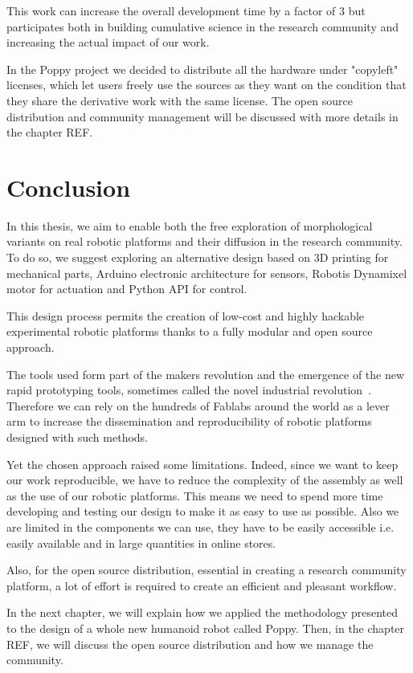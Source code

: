 This work can increase the overall development time by a factor of 3 but participates both in building cumulative science in the research community and increasing the actual impact of our work.

In the Poppy project we decided to distribute all the hardware under "copyleft" licenses, which let users freely use the sources as they want on the condition that they share the derivative work with the same license.
The open source distribution and community management will be discussed with more details in the chapter REF.


\section{Conclusion} %

In this thesis, we aim to enable both the free exploration of morphological variants on real robotic platforms and their diffusion in the research community. To do so, we suggest exploring an alternative design based on 3D printing for mechanical parts, Arduino electronic architecture for sensors, Robotis Dynamixel motor for actuation and Python API for control.

This design process permits the creation of low-cost and highly hackable experimental robotic platforms thanks to a fully modular and open source approach.

The tools used form part of the makers revolution and the emergence of the new rapid prototyping tools, sometimes called the novel industrial revolution~\parencite{anderson}. Therefore we can rely on the hundreds of Fablabs around the world as a lever arm to increase the dissemination and reproducibility of robotic platforms designed with such methods.

Yet the chosen approach raised some limitations. Indeed, since we want to keep our work reproducible, we have to reduce the complexity of the assembly as well as the use of our robotic platforms. This means we need to spend more time developing and testing our design to make it as easy to use as possible. Also we are limited in the components we can use, they have to be easily accessible i.e. easily available and in large quantities in online stores.

Also, for the open source distribution, essential in creating a research community platform, a lot of effort is required to create an efficient and pleasant workflow.

In the next chapter, we will explain how we applied the methodology presented to the design of a whole new humanoid robot called Poppy. Then, in the chapter REF, we will discuss the open source distribution and how we manage the community.





